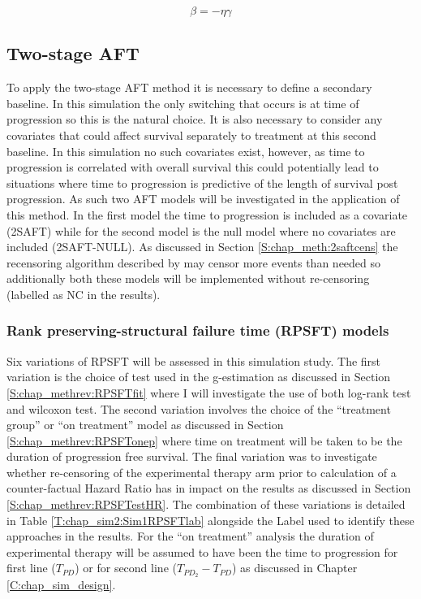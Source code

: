 \begin{equation}
\label{E:chap_sim2:mipehr}
\beta = -\eta\gamma
\end{equation}

\subsection{Two-stage AFT}
To apply the two-stage AFT method it is necessary to define a secondary baseline. In this simulation the only switching that occurs is at time of progression so this is the natural choice. It is also necessary to consider any covariates that could affect survival separately to treatment at this second baseline. In this simulation no such covariates exist, however, as time to progression is correlated with overall survival this could potentially lead to situations where time to progression is predictive of the length of survival post progression. As such two AFT models will be investigated in the application of this method. In the first model the time to progression is included as a covariate (2SAFT) while for the second model is the null model where no covariates are included (2SAFT-NULL). As discussed in Section \ref{S:chap_meth:2saftcens} the recensoring algorithm described by \cite{Latimer2016} may censor more events than needed so additionally both these models will be implemented without re-censoring (labelled as NC in the results).

\subsubsection{Rank preserving-structural failure time (RPSFT) models} 
Six variations of RPSFT will be assessed in this simulation study. The first variation is the choice of test used in the g-estimation as discussed in Section \ref{S:chap_methrev:RPSFTfit} where I will investigate the use of both log-rank test and wilcoxon test. The second variation involves the choice of the ``treatment group'' or ``on treatment'' model as discussed in Section \ref{S:chap_methrev:RPSFTonep} where time on treatment will be taken to be the duration of progression free survival. The final variation was to investigate whether re-censoring of the experimental therapy arm prior to calculation of a counter-factual Hazard Ratio has in impact on the results as discussed in Section \ref{S:chap_methrev:RPSFTestHR}. The combination of these variations is detailed in Table \ref{T:chap_sim2:Sim1RPSFTlab} alongside the Label used to identify these approaches in the results. For the ``on treatment'' analysis the duration of experimental therapy will be assumed to have been the time to progression for first line ($T_{PD}$) or for second line ($T_{PD_2}-T_{PD}$) as discussed in Chapter \ref{C:chap_sim_design}. 

